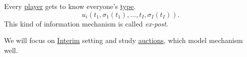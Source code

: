 \begin{definition}[Ex-post]\label{def:ex-post}
	Every \hyperref[def:player]{player} gets to know everyone's \hyperref[def:type]{type}.
	\[
		u_{i}(t_1, \sigma_1(t_1), \dots , t_{I}, \sigma_{I}(t_{I})).
	\]
	This kind of information mechanism is called \emph{ex-post}.
\end{definition}

We will focus on \hyperref[def:interim]{Interim} setting and study \hyperref[ch:auctions]{auctions}, which model mechanism  well.